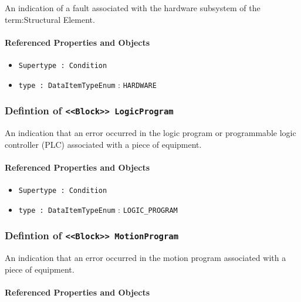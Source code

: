 \FloatBarrier

An indication of a fault associated with the hardware subsystem of the {term:Structural Element}.

\FloatBarrier
\paragraph{Referenced Properties and Objects}

\begin{itemize}
\item \texttt{Supertype : Condition}

\item \texttt{type : DataItemTypeEnum} : \texttt{HARDWARE}

\end{itemize}
\FloatBarrier
\subsubsection{Defintion of \texttt{<<Block>> LogicProgram}}
  \label{type:LogicProgram}

\FloatBarrier

An indication that an error occurred in the logic program or programmable logic controller (PLC) associated with a piece of equipment.

\FloatBarrier
\paragraph{Referenced Properties and Objects}

\begin{itemize}
\item \texttt{Supertype : Condition}

\item \texttt{type : DataItemTypeEnum} : \texttt{LOGIC_PROGRAM}

\end{itemize}
\FloatBarrier
\subsubsection{Defintion of \texttt{<<Block>> MotionProgram}}
  \label{type:MotionProgram}

\FloatBarrier

An indication that an error occurred in the motion program associated with a piece of equipment.

\FloatBarrier
\paragraph{Referenced Properties and Objects}

